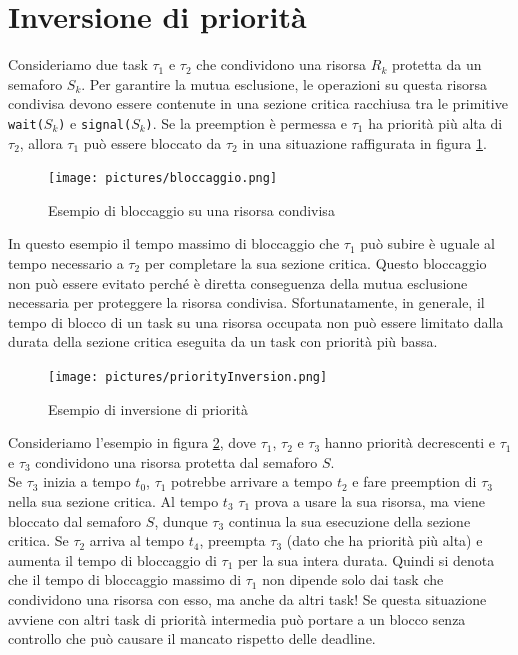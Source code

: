 \documentclass[12pt,openany,onesided]{book}
\begin{document}
\section{Inversione di priorità}
Consideriamo due task $\tau_1$ e $\tau_2$ che condividono una risorsa $R_k$ protetta da un semaforo $S_k$.
Per garantire la mutua esclusione, le operazioni su questa risorsa condivisa devono essere contenute in una sezione critica racchiusa tra le primitive \texttt{wait($S_k$)} e \texttt{signal($S_k$)}.
Se la preemption è permessa e $\tau_1$ ha priorità più alta di $\tau_2$, allora $\tau_1$ può essere bloccato da $\tau_2$ in una situazione raffigurata in figura \ref{fig:inversionPriorita}.
\begin{figure}[h]
    \centering
    \texttt{[image: pictures/bloccaggio.png]}
    \caption{Esempio di bloccaggio su una risorsa condivisa}
    \label{fig:inversionPriorita}
\end{figure}
In questo esempio il tempo massimo di bloccaggio che $\tau_1$ può subire è uguale al tempo necessario a $\tau_2$ per completare la sua sezione critica.
Questo bloccaggio non può essere evitato perché è diretta conseguenza della mutua esclusione necessaria per proteggere la risorsa condivisa.
Sfortunatamente, in generale, il tempo di blocco di un task su una risorsa occupata non può essere limitato dalla durata della sezione critica eseguita da un task con priorità più bassa.
\begin{figure}
    \centering
    \texttt{[image: pictures/priorityInversion.png]}
    \caption{Esempio di inversione di priorità}
    \label{fig:inversionePriorita}
\end{figure}
Consideriamo l'esempio in figura \ref{fig:inversionePriorita}, dove $\tau_1$, $\tau_2$ e $\tau_3$ hanno priorità decrescenti e $\tau_1$ e $\tau_3$ condividono una risorsa protetta dal semaforo $S$.
\\
Se $\tau_3$ inizia a tempo $t_0$, $\tau_1$ potrebbe arrivare a tempo $t_2$ e fare preemption di $\tau_3$ nella sua sezione critica.
Al tempo $t_3$ $\tau_1$ prova a usare la sua risorsa, ma viene bloccato dal semaforo $S$, dunque $\tau_3$ continua la sua esecuzione della sezione critica.
Se $\tau_2$ arriva al tempo $t_4$, preempta $\tau_3$ (dato che ha priorità più alta) e aumenta il tempo di bloccaggio di $\tau_1$ per la sua intera durata.
Quindi si denota che il tempo di bloccaggio massimo di $\tau_1$ non dipende solo dai task che condividono una risorsa con esso, ma anche da altri task!
Se questa situazione avviene con altri task di priorità intermedia può portare a un blocco senza controllo che può causare il mancato rispetto delle deadline.
\end{document}
